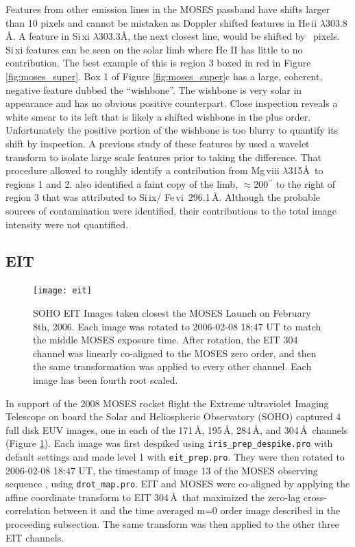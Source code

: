 		
		Features from other emission lines in the MOSES passband have shifts larger than 10 pixels and cannot be mistaken as Doppler shifted features in He\,{\sc ii}  $\lambda303.8$ \AA. 
		A feature in Si\,{\sc xi} $\lambda$303.3\AA, the next closest line, would be shifted by \sixipix\ pixels. 
		Si\,{\sc xi} features can be seen on the solar limb where He II has little to no contribution. 
		The best example of this is region 3 boxed in red in Figure \ref{fig:moses_super}.  
		Box 1 of Figure \ref{fig:moses_super}c has a large, coherent, negative feature dubbed the ``wishbone''.  
		The wishbone is very solar in appearance and has no obvious positive counterpart.  
		Close inspection reveals a white smear to its left that is likely a shifted wishbone in the plus order.  
		Unfortunately the positive portion of the wishbone is too blurry to quantify its shift by inspection. 
		A previous study of these features by \citet{Rust2017} used a wavelet transform to isolate large scale features prior to taking the difference.  
		That procedure allowed \citet{Rust2017} to roughly identify a contribution from Mg\,{\sc viii} $\lambda$315\AA \  to regions 1 and 2.
		\citet{Rust2017} also identified a faint copy of the limb, $\approx$200$^{\prime\prime}$ to the right of region 3 that was attributed to Si\,{\sc ix}/ Fe\,{\sc vi}\ 296.1\,\AA.
		Although the probable sources of contamination were identified, their contributions to the total image intensity were not quantified.
	
	\subsection{EIT}\label{sec:EIT_data}
		\begin{figure}
			\centering
			\texttt{[image: eit]}
			\caption{SOHO EIT Images taken closest the MOSES Launch on February 8th, 2006. Each image was rotated to 2006-02-08 18:47 UT to match the middle MOSES exposure time.  After rotation, the EIT 304 channel was linearly co-aligned to the MOSES zero order, and then the same transformation was applied to every other channel.  Each image has been fourth root scaled.}
			\label{fig:EIT}
		\end{figure}
	
		In support of the 2008 MOSES rocket flight the Extreme ultraviolet Imaging Telescope \citep[EIT:][]{EIT} on board the Solar and Heliospheric Observatory (SOHO) captured 4 full disk EUV images, one in each of the 171\,\AA, 195\,\AA, 284\,\AA, and 304\,\AA\ channels (Figure \ref{fig:EIT}). 
		Each image was first despiked using \texttt{iris\_prep\_despike.pro} with default settings and made level 1 with \texttt{eit\_prep.pro}. 
		They were then rotated to 2006-02-08 18:47 UT, the timestamp of image 13 of the MOSES observing sequence \citep{Fox2011}, using \texttt{drot\_map.pro}.
		EIT and MOSES were co-aligned by applying the affine coordinate transform to EIT 304\,\AA\ that maximized the zero-lag cross-correlation between it and the time averaged m=0 order image described in the proceeding subsection.
		The same transform was then applied to the other three EIT channels.
	 
